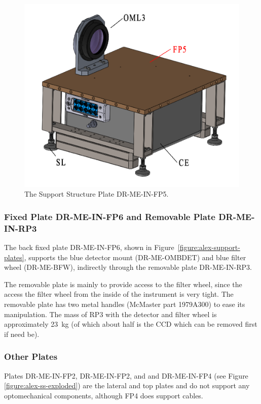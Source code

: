 \documentclass{article}
\newcommand{\TODO}[1]{\textcolor{red}{TODO: #1}}
\begin{document}
\begin{figure}
\begin{center}
\includegraphics[width=0.6\linewidth]{newfigures/Fig3_6.png}
\end{center}
\caption{The Support Structure Plate DR-ME-IN-FP5.}
\label{figure:alex-ss-fp5}
\end{figure}

\subsubsection{Fixed Plate DR-ME-IN-FP6 and Removable Plate DR-ME-IN-RP3}

The back fixed plate DR-ME-IN-FP6, shown in Figure~\ref{figure:alex-support-plates}, supports the blue detector mount (DR-ME-OMBDET) and blue filter wheel (DR-ME-BFW), indirectly through the removable plate DR-ME-IN-RP3. 

The removable plate is mainly to provide access to the filter wheel, since the access the filter wheel from the inside of the instrument is very tight. The removable plate has two metal handles (McMaster part 1979A300) to ease its manipulation. The mass of RP3 with the detector and filter wheel is approximately 23~kg (of which about half is the CCD which can be removed first if need be).



\subsubsection{Other Plates}

Plates DR-ME-IN-FP2, DR-ME-IN-FP2, and and DR-ME-IN-FP4 (see Figure \ref{figure:alex-ss-exploded}) are the lateral and top plates and do not support any optomechanical components, although FP4 does support cables.
\end{document}
